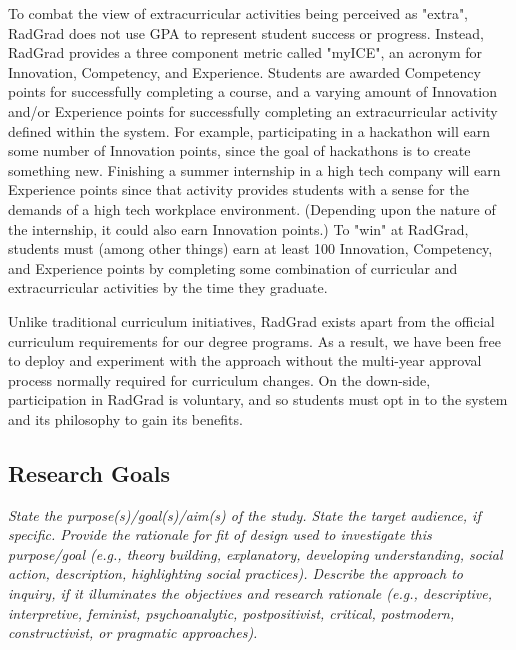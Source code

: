 \documentclass[acmsmall]{acmart}
\begin{document}
To combat the view of extracurricular activities being perceived as "extra", RadGrad does not use GPA to represent student success or progress. Instead, RadGrad provides a three component metric called "myICE", an acronym for Innovation, Competency, and Experience. Students are awarded Competency points for successfully completing a course, and a varying amount of Innovation and/or Experience points for successfully completing an extracurricular activity defined within the system. For example, participating in a hackathon will earn some number of Innovation points, since the goal of hackathons is to create something new.  Finishing a summer internship in a high tech company will earn Experience points since that activity provides students with a sense for the demands of a high tech workplace environment. (Depending upon the nature of the internship, it could also earn Innovation points.) To "win" at RadGrad, students must (among other things) earn at least 100 Innovation, Competency, and Experience points by completing some combination of curricular and extracurricular activities by the time they graduate.

Unlike traditional curriculum initiatives, RadGrad exists apart from the official curriculum requirements for our degree programs. As a result, we have been free to deploy and experiment with the approach without the multi-year approval process normally required for curriculum changes.  On the down-side, participation in RadGrad is voluntary, and so students must opt in to the system and its philosophy to gain its benefits.

\subsection{Research Goals}
{\em\small State the purpose(s)/goal(s)/aim(s) of the study. State the target audience, if specific. Provide the rationale for fit of design used to investigate this purpose/goal (e.g., theory building, explanatory, developing understanding, social action, description, highlighting social practices). Describe the approach to inquiry, if it illuminates the objectives and research rationale (e.g., descriptive, interpretive, feminist, psychoanalytic, postpositivist, critical, postmodern, constructivist, or pragmatic approaches).}
\end{document}
